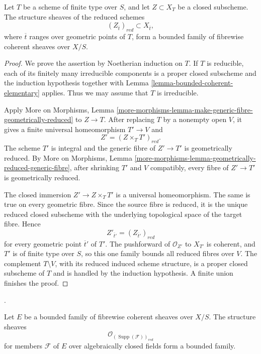 \begin{lemma}
\label{lemma-bounded-fibrewise-reductions}
Let $T$ be a scheme of finite type over $S$, and let
$Z \subset X_T$ be a closed subscheme. The structure sheaves of the reduced
schemes
$$
(Z_{\overline{t}})_{red} \subset X_{\overline{t}},
$$
where $\overline{t}$ ranges over geometric points of $T$, form a bounded
family of fibrewise coherent sheaves over $X/S$.
\end{lemma}

\begin{proof}
We prove the assertion by Noetherian induction on $T$. If $T$ is reducible,
each of its finitely many irreducible components is a proper closed
subscheme and the induction hypothesis together with Lemma
\ref{lemma-bounded-coherent-elementary} applies. Thus we may assume that
$T$ is irreducible.

Apply More on Morphisms, Lemma
\ref{more-morphisms-lemma-make-generic-fibre-geometrically-reduced} to
$Z \to T$. After replacing $T$ by a nonempty open $V$, it gives a finite
universal homeomorphism $T' \to V$ and
$$
Z'=(Z \times_T T')_{red}.
$$
The scheme $T'$ is integral and the generic fibre of $Z' \to T'$ is
geometrically reduced. By More on Morphisms, Lemma
\ref{more-morphisms-lemma-geometrically-reduced-generic-fibre}, after
shrinking $T'$ and $V$ compatibly, every fibre of $Z' \to T'$ is
geometrically reduced.

The closed immersion $Z' \to Z \times_T T'$ is a universal homeomorphism.
The same is true on every geometric fibre. Since the source fibre is
reduced, it is the unique reduced closed subscheme with the underlying
topological space of the target fibre. Hence
$$
Z'_{\overline{t}'} = (Z_{\overline{t}'})_{red}
$$
for every geometric point $\overline{t}'$ of $T'$. The pushforward of
$\mathcal{O}_{Z'}$ to $X_{T'}$ is coherent, and $T'$ is of finite type over
$S$, so this one family bounds all reduced fibres over $V$. The complement
$T \setminus V$, with its reduced induced scheme structure, is a proper
closed subscheme of $T$ and is handled by the induction hypothesis. A finite
union finishes the proof.
\end{proof}

\begin{proposition}
\label{proposition-bounded-coherent-reduced-supports}
\begin{reference}
\cite[Expos\'e 221, Proposition 1.3, p. 253]{FGA}.
\end{reference}
Let $E$ be a bounded family of fibrewise coherent sheaves over $X/S$.
The structure sheaves
$$
\mathcal{O}_{(\operatorname{Supp}(\mathcal{F}))_{red}}
$$
for members $\mathcal{F}$ of $E$ over algebraically closed fields form a
bounded family.
\end{proposition}

